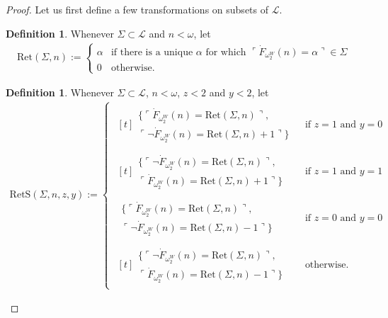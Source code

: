\documentclass[12pt, twoside]{memoir}
\numberwithin{equation}{section}
\theoremstyle{definition}
\newtheorem{defi}[thm]{Definition}
\theoremstyle{remark}
\theoremstyle{definition}
\theoremstyle{definition}
\theoremstyle{definition}
\theoremstyle{remark}
\begin{document}
\begin{proof}
Let us first define a few transformations on subsets of $\mathcal{L}$.

\begin{defi}
Whenever $\Sigma \subset \mathcal{L}$ and $n < \omega$, let
\begin{align*}
    \mathrm{Ret}(\Sigma, n) := 
    \begin{cases}
        \alpha & \text{if there is a unique } \alpha \text{ for which } \ulcorner \dot{F}_{\omega_2^W}(n) = \alpha \urcorner \in \Sigma \\
        0 & \text{otherwise.}
    \end{cases}
\end{align*}
\end{defi}

\begin{defi}
Whenever $\Sigma \subset \mathcal{L}$, $n < \omega$, $z < 2$ and $y < 2$, let
\begin{align*}
    \mathrm{RetS}(\Sigma, n, z, y) := 
    \begin{cases}
    \!\begin{aligned}[t]
    \begin{split}
        \{\ulcorner \dot{F}_{\omega_2^W}(n) = \mathrm{Ret}(\Sigma, n) \urcorner, \\
        \ulcorner \neg \dot{F}_{\omega_2^W}(n) = \mathrm{Ret}(\Sigma, n) + 1 \urcorner\}
    \end{split}
    \end{aligned} & \text{if } z = 1 \text{ and } y = 0 \\
    \!\begin{aligned}[t]
    \begin{split}
        \{\ulcorner \neg \dot{F}_{\omega_2^W}(n) = \mathrm{Ret}(\Sigma, n) \urcorner, \\
        \ulcorner \dot{F}_{\omega_2^W}(n) = \mathrm{Ret}(\Sigma, n) + 1 \urcorner\}
    \end{split}
    \end{aligned} & \text{if } z = 1 \text{ and } y = 1 \\
    \!\begin{aligned}
    \begin{split}
        \{\ulcorner \dot{F}_{\omega_2^W}(n) = \mathrm{Ret}(\Sigma, n) \urcorner, \\
        \ulcorner \neg \dot{F}_{\omega_2^W}(n) = \mathrm{Ret}(\Sigma, n) - 1 \urcorner\} 
    \end{split}
    \end{aligned} & \text{if } z = 0 \text{ and } y = 0 \\
    \!\begin{aligned}[t]
    \begin{split}
        \{\ulcorner \neg \dot{F}_{\omega_2^W}(n) = \mathrm{Ret}(\Sigma, n) \urcorner, \\
        \ulcorner \dot{F}_{\omega_2^W}(n) = \mathrm{Ret}(\Sigma, n) - 1 \urcorner\}
    \end{split}
    \end{aligned} & \text{otherwise.}
    \end{cases}
\end{align*}
\end{defi}


\end{proof}
\end{document}
